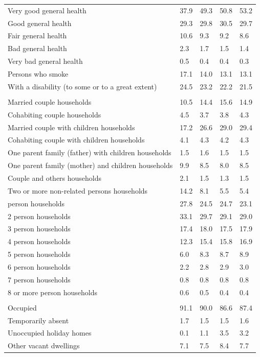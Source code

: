 \documentclass{article}
\begin{document}
\begin{table}[h]
\begin{tabular}{KTTTT}
    \hline
Very good general health & 37.9& 49.3&50.8& 53.2\\
Good general health & 29.3& 29.8& 30.5& 29.7\\
Fair general health & 10.6&  9.3& 9.2&  8.6\\
Bad general health & 2.3& 1.7&1.5& 1.4\\
Very bad general health & 0.5& 0.4&0.4& 0.3\\
    \hline
Persons who smoke & 17.1& 14.0&13.1& 13.1\\
    \hline
With a disability (to some or to a great extent) & 24.5& 23.2&22.2& 21.5\\
\hline
    \\ 
    \hline
Married couple households & 10.5& 14.4& 15.6& 14.9\\
Cohabiting couple households & 4.5& 3.7& 3.8& 4.3\\
Married couple with children households & 17.2& 26.6& 29.0& 29.4\\
Cohabiting couple with children households & 4.1& 4.3& 4.2& 4.3\\
One parent family (father) with  children households & 1.5& 1.6& 1.5& 1.5\\
One parent family (mother) and children households & 9.9& 8.5& 8.0& 8.5\\
Couple and others households  & 2.1& 1.5& 1.3& 1.5\\
Two or more non-related persons households & 14.2&  8.1&  5.5&  5.4\\
     person households & 27.8& 24.5& 24.7& 23.1\\
2 person households & 33.1& 29.7& 29.1& 29.0\\
3 person households & 17.4& 18.0& 17.5& 17.9\\
4 person households & 12.3& 15.4& 15.8& 16.9\\
5 person households & 6.0& 8.3& 8.7& 8.9\\
6 person households & 2.2& 2.8& 2.9& 3.0\\
7 person households & 0.8& 0.8& 0.8& 0.8\\
8 or more person households & 0.6& 0.5& 0.4& 0.4\\
\hline
    \\ 
    \hline
Occupied & 91.1& 90.0& 86.6& 87.4\\
Temporarily absent & 1.7& 1.5& 1.5& 1.6\\
Unoccupied holiday homes & 0.1& 1.1& 3.5& 3.2\\
Other vacant dwellings & 7.1& 7.5& 8.4& 7.7\\
\hline
\end{tabular}
\end{table}
\end{document}
